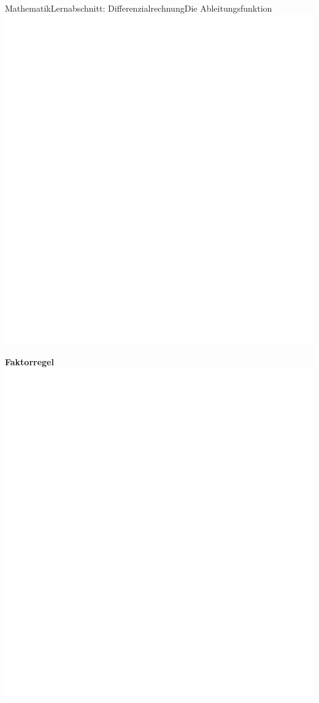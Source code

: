 \documentclass[11pt,twocolumn,oneside,openany,headings=optiontotoc,11pt,numbers=noenddot]{article}
\begin{document}
\begin{worksheet}{Mathematik}{Lernabschnitt: Differenzialrechnung}{Die Ableitungsfunktion}
		\includegraphics[scale=0.1]{../../empty.jpg}\\
		\par
		\textbf{Faktorregel}\\
		\includegraphics[scale=0.1]{../../empty.jpg}\\

\end{worksheet}
\end{document}
